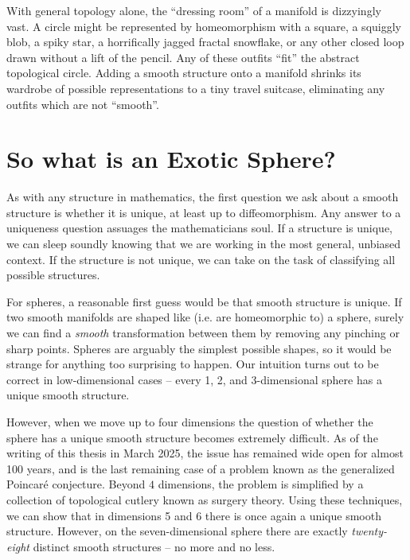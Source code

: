 With general topology alone, the ``dressing room'' of a manifold is dizzyingly vast.
A circle might be represented by homeomorphism with a square, a squiggly blob, a spiky star, a horrifically jagged fractal snowflake, or any other closed loop drawn without a lift of the pencil. Any of these outfits ``fit'' the abstract topological circle.
Adding a smooth structure onto a manifold shrinks its wardrobe of possible representations to a tiny travel suitcase, eliminating any outfits which are not ``smooth''.

\section*{So what is an Exotic Sphere?}

As with any structure in mathematics, the first question we ask about a smooth structure is whether it is unique, at least up to diffeomorphism. Any answer to a uniqueness question assuages the mathematicians soul. If a structure is unique, we can sleep soundly knowing that we are working in the most general, unbiased context. If the structure is not unique, we can take on the task of classifying all possible structures.

For spheres, a reasonable first guess would be that smooth structure is unique. If two smooth manifolds are shaped like (i.e. are homeomorphic to) a sphere, surely we can find a \emph{smooth} transformation between them by removing any pinching or sharp points. Spheres are arguably the simplest possible shapes, so it would be strange for anything too surprising to happen. Our intuition turns out to be correct in low-dimensional cases -- every 1, 2, and 3-dimensional sphere has a unique smooth structure. 
%

However, when we move up to four dimensions the question of whether the sphere has a unique smooth structure becomes extremely difficult. As of the writing of this thesis in March 2025, the issue has remained wide open for almost 100 years, and is the last remaining case of a problem known as the generalized Poincar\'e conjecture. Beyond $4$ dimensions, the problem is simplified by a collection of topological cutlery known as surgery theory.
Using these techniques, we can show that in dimensions 5 and 6 there is once again a unique smooth structure. However, on the seven-dimensional sphere there are exactly \emph{twenty-eight} distinct smooth structures -- no more and no less. 

